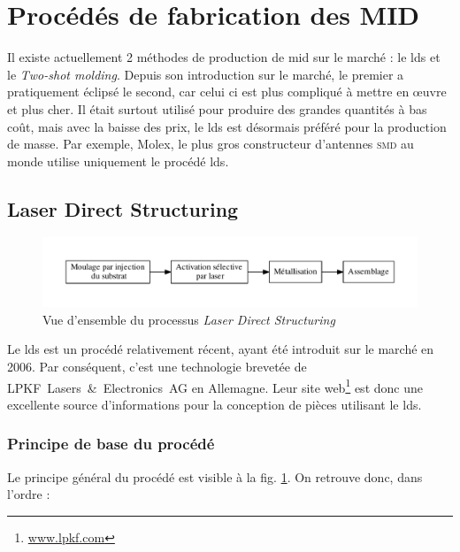 \section{Procédés de fabrication des MID}
Il existe actuellement 2 méthodes de production de \gls{mid} sur le marché : le \gls{lds} et le \emph{Two-shot molding}.
Depuis son introduction sur le marché, le premier a pratiquement éclipsé le second, car celui ci est plus compliqué à mettre en œuvre et plus cher.
Il était surtout utilisé pour produire des grandes quantités à bas coût, mais avec la baisse des prix, le \gls{lds} est désormais préféré pour la production de masse.
Par exemple, Molex, le plus gros constructeur d'antennes \textsc{smd} au monde utilise uniquement le procédé \gls{lds}.

\subsection{Laser Direct Structuring}
\begin{figure}[h]
    \begin{center}
        \includegraphics[width=\textwidth]{images/lds_process}
        \caption{Vue d'ensemble du processus \emph{Laser Direct Structuring}}\label{fig:lds-process}
    \end{center}
\end{figure}
Le \gls{lds} est un procédé relativement récent, ayant été introduit sur le marché en 2006.
Par conséquent, c'est une technologie brevetée de LPKF~Lasers~\&~Electronics~AG en Allemagne.
Leur site web\footnote{\url{www.lpkf.com}} est donc une excellente source d'informations pour la conception de pièces utilisant le \gls{lds}.

\subsubsection{Principe de base du procédé}
Le principe général du procédé est visible à la fig.
\ref{fig:lds-process}.
On retrouve donc, dans l'ordre :

